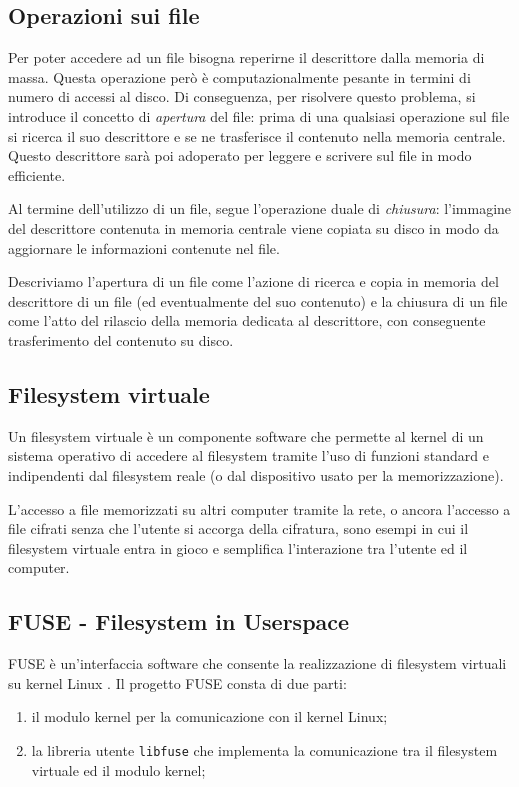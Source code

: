 \documentclass[a4paper,12pt,twoside,openright]{report}
\begin{document}
  \subsection{Operazioni sui file}

  Per poter accedere ad un file bisogna reperirne il descrittore dalla memoria di massa. Questa operazione però è
  computazionalmente pesante in termini di numero di accessi al disco. Di conseguenza, per risolvere
  questo problema, si introduce il concetto di \textit{apertura} del file: prima di una qualsiasi
  operazione sul file si ricerca il suo descrittore e se ne trasferisce il contenuto nella memoria centrale.
  Questo descrittore sarà poi adoperato per leggere e scrivere sul file in modo efficiente.
  
  Al termine dell'utilizzo di un file, segue l'operazione duale di \textit{chiusura}: l'immagine del descrittore
  contenuta in memoria centrale viene copiata su disco in modo da aggiornare le informazioni contenute nel file.

  Descriviamo l'apertura di un file come l'azione di ricerca e copia in memoria del
  descrittore di un file (ed eventualmente del suo contenuto) e la chiusura di un file come 
  l'atto del rilascio della memoria dedicata al descrittore, con conseguente trasferimento del contenuto su disco.

  \subsection{Filesystem virtuale}

  Un filesystem virtuale è un componente software che permette al kernel di un sistema operativo di accedere
  al filesystem tramite l'uso di funzioni standard e indipendenti dal filesystem reale (o dal dispositivo usato per la memorizzazione).

  L'accesso a file memorizzati su altri computer tramite la rete, o ancora l'accesso a file
  cifrati senza che l'utente si accorga della cifratura, sono esempi in cui il filesystem virtuale entra in gioco
  e semplifica l'interazione tra l'utente ed il computer.

  \subsection{FUSE - Filesystem in Userspace}

  FUSE è un'interfaccia software che consente la realizzazione di filesystem virtuali su kernel Linux \cite{libfusegithub}.
  Il progetto FUSE consta di due parti:
  \begin{enumerate}
    \item il modulo kernel per la comunicazione con il kernel Linux;
    \item la libreria utente \texttt{libfuse} che implementa la comunicazione tra il filesystem virtuale ed il modulo kernel;
  \end{enumerate}
\end{document}
